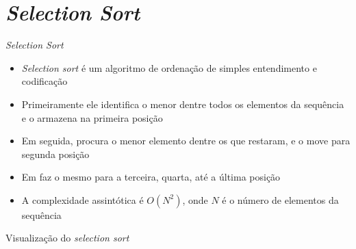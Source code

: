 \section{\itshape Selection Sort}

\begin{frame}[fragile]{\itshape Selection Sort}

    \begin{itemize}
        \item \textit{Selection sort} é um algoritmo de ordenação de simples entendimento e
            codificação

        \item Primeiramente ele identifica o menor dentre todos os elementos da sequência e 
            o armazena na primeira posição

        \item Em seguida, procura o menor elemento dentre os que restaram, e o move para 
            segunda posição

        \item Em faz o mesmo para a terceira, quarta, até a última posição

        \item A complexidade assintótica é $O(N^2)$, onde $N$ é o número de elementos da 
            sequência
    \end{itemize}

\end{frame}

\begin{frame}[fragile]{Visualização do \textit{selection sort}}


\end{frame}

